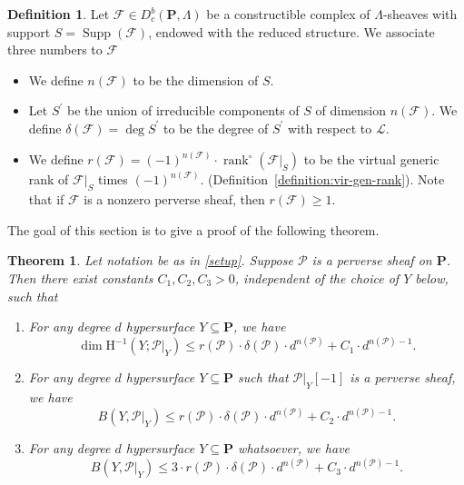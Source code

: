 \documentclass[english]{smfart}
\renewcommand{\mathbb}{\mathbf}
\renewcommand{\leq}{\leqslant}
\renewcommand{\geq}{\geqslant}
\renewcommand{\subset}{\subseteq}
\theoremstyle{remark}
\theoremstyle{plain}
\newtheorem{theorem}[remark]{Theorem}
\theoremstyle{definition}
\newtheorem{definition}[remark]{Definition}
\numberwithin{equation}{remark}
\theoremstyle{void}
\begin{document}
\begin{definition}
Let \(\mathcal{F} \in D^{b}_{c}(\mathbb{P},\Lambda)\) be a
constructible complex of \(\Lambda\)-sheaves with support
\(S = \operatorname{Supp}(\mathcal{F})\), endowed with the reduced
structure.  We associate three numbers to \(\mathcal{F}\)
\begin{itemize}
\item We define \(n(\mathcal{F})\) to be the dimension of \(S\).
\item Let \(S^{\prime}\) be the union of irreducible components of
\(S\) of dimension \(n(\mathcal{F})\).  We define
\(\delta(\mathcal{F}) = \deg S^{\prime}\) to be the degree of
\(S^{\prime}\) with respect to \(\mathscr{L}\).
\item We define
\(r(\mathcal{F}) = (-1)^{n(\mathcal{F})} \cdot \operatorname{rank}^{\circ}(\mathcal{F}|_S)\)
to be the virtual generic rank of \(\mathcal{F}|_{S}\) times
\((-1)^{n(\mathcal{F})}\).
(Definition~\ref{definition:vir-gen-rank}).  Note that if
\(\mathcal{F}\) is a nonzero perverse sheaf, then
\(r(\mathcal{F}) \geq 1\).
\end{itemize}
\end{definition}


The goal of this section is to give a proof of the following theorem.

\begin{theorem}\label{theorem:main}
Let notation be as in \ref{setup}.  Suppose \(\mathcal{P}\) is a
perverse sheaf on \(\mathbb{P}\).  Then there exist constants
\(C_1, C_2, C_3 > 0\), independent of the choice of \(Y\) below, such
that
\begin{enumerate}
\item For any degree \(d\) hypersurface \(Y \subset \mathbb{P}\),
we have
\[
\dim \mathrm{H}^{-1}(Y;\mathcal{P}|_Y) \leq r(\mathcal{P}) \cdot \delta(\mathcal{P}) \cdot d^{n(\mathcal{P})} +
C_1 \cdot d^{n(\mathcal{P})-1}.
\]
\item For any degree \(d\) hypersurface \(Y \subset \mathbb{P}\) such
that \(\mathcal{P}|_Y[-1]\) is a perverse sheaf, we have
\[
B(Y, \mathcal{P}|_{Y}) \leq r(\mathcal{P}) \cdot \delta(\mathcal{P}) \cdot d^{n(\mathcal{P})} + C_2 \cdot d^{n(\mathcal{P})-1}.
\]
\item For any degree \(d\) hypersurface \(Y \subset \mathbb{P}\) whatsoever, we
have
\[
B(Y, \mathcal{P}|_{Y}) \leq 3\cdot r(\mathcal{P}) \cdot \delta(\mathcal{P}) \cdot d^{n(\mathcal{P})} + C_3 \cdot d^{n(\mathcal{P})-1}.
\]
\end{enumerate}
\end{theorem}
\end{document}
